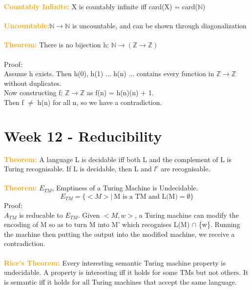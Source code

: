 \documentclass[a4paper,10pt]{article}
\begin{document}
\textcolor{Orange}{\textbf{Countably Infinite:}} X is countably infinite iff card(X) = card($\mathbb{N}$) \\\\
\textcolor{Orange}{\textbf{Uncountable:}}$\mathbb{N} \rightarrow \mathbb{N}$ is uncountable, and can be shown through diagonalization\\\\
\textcolor{Orange}{\textbf{Theorem:}} There is no bijection h: $\mathbb{N} \rightarrow (\mathbb{Z} \rightarrow \mathbb{Z})$ \\\\
Proof: \\ 
Assume h exists. Then h(0), h(1) ... h(n) ... contains every function in $\mathbb{Z} \rightarrow \mathbb{Z}$ without duplicates. \\ 
Now constructing f: $\mathbb{Z}\rightarrow \mathbb{Z}$ as f(n) = h(n)(n) + 1. \\ 
Then f $\neq$ h(n) for all n, so we have a contradiction. 
\newpage 
\section*{Week 12 - Reducibility}
\textcolor{Orange}{\textbf{Theorem:}} A language L is decidable iff both L and the complement of L is Turing recognisable. If L is decidable, then L and $l^{c}$ are recognisable.  \\\\
\textcolor{Orange}{\textbf{Theorem:}} $E_{TM}$, Emptiness of a Turing Machine is Undecidable.
\begin{equation*}
E_{TM} = \{<M> | \ \textrm{M is a TM and L(M)} = \emptyset \}
\end{equation*}
Proof: \\ 
$A_{TM}$ is reducable to $E_{TM}$. Given $<M,w>$, a Turing machine can modify the encoding of M so as to turn M into M' which recognises L(M) $\cap$ \{w\}. Running the machine then putting the output into the modified machine, we receive a contradiction. \\\\
\textcolor{Orange}{\textbf{Rice's Theorem:}} Every interesting semantic Turing machine property is undecidable. A property is interesting iff it holds for some TMs but not others. It is semantic iff it holds for all Turing machines that accept the same language. \\\\
\textcolor{Orange}{\textbf{}} \\\\
\textcolor{Orange}{\textbf{}} \\\\
\end{document}

